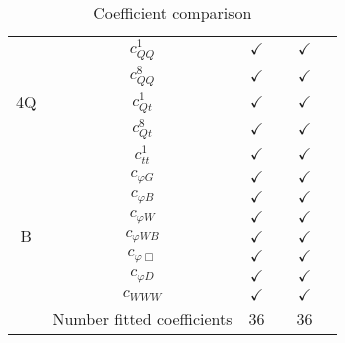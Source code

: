 \documentclass{article}
\begin{document}
\begin{table}[H]
\begin{tabular}{|c|c|c|c|c|c|}
\multirow{5}{*}{4Q}
 & $c_{QQ}^{1}$ & $\checkmark$ &  & $\checkmark$ & \\ \cline{2-6}
 & $c_{QQ}^{8}$ & $\checkmark$ &  & $\checkmark$ & \\ \cline{2-6}
 & $c_{Qt}^{1}$ & $\checkmark$ &  & $\checkmark$ & \\ \cline{2-6}
 & $c_{Qt}^{8}$ & $\checkmark$ &  & $\checkmark$ & \\ \cline{2-6}
 & $c_{tt}^{1}$ & $\checkmark$ &  & $\checkmark$ &
\\ \hline
\multirow{7}{*}{B}
 & $c_{\varphi G}$ & $\checkmark$ &  & $\checkmark$ & \\ \cline{2-6}
 & $c_{\varphi B}$ & $\checkmark$ &  & $\checkmark$ & \\ \cline{2-6}
 & $c_{\varphi W}$ & $\checkmark$ &  & $\checkmark$ & \\ \cline{2-6}
 & $c_{\varphi WB}$ & $\checkmark$ &  & $\checkmark$ & \\ \cline{2-6}
 & $c_{\varphi \Box}$ & $\checkmark$ &  & $\checkmark$ & \\ \cline{2-6}
 & $c_{\varphi D}$ & $\checkmark$ &  & $\checkmark$ & \\ \cline{2-6}
 & $c_{WWW}$ & $\checkmark$ &  & $\checkmark$ &
\\ \hline
\hline & Number fitted coefficients & 36 &  & 36 &  \\ \hline
\end{tabular}
\caption{Coefficient comparison}
\end{table}
\end{document}
